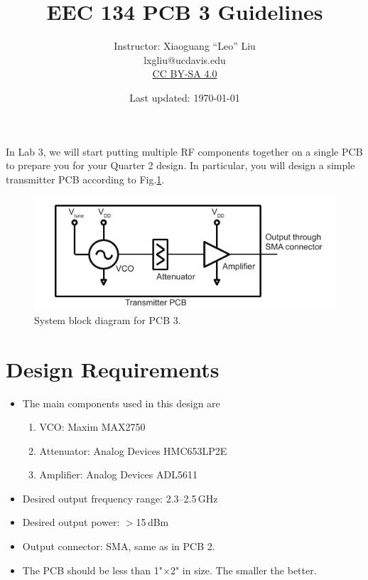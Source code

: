 \documentclass[letterpaper, 11pt]{article}
\begin{document}
\title{EEC 134 PCB 3 Guidelines}
\author{Instructor: Xiaoguang ``Leo'' Liu\\lxgliu@ucdavis.edu \\
	\small \href{http://creativecommons.org/licenses/by-sa/4.0/}{CC BY-SA 4.0}}
\date{Last updated: \today}

\maketitle

In Lab 3, we will start putting multiple RF components together on a single PCB to prepare you for your Quarter 2 design. In particular, you will design a simple transmitter PCB according to Fig.\ref{fig:pcb3}.

\begin{figure}[h]
	\centering
	\includegraphics{blockdiagram.pdf}
	\caption{System block diagram for PCB 3.}
	\label{fig:pcb3}
\end{figure}

\section{Design Requirements}

\begin{itemize}
	\item The main components used in this design are 
		\begin{enumerate}
			\item VCO: Maxim MAX2750
			\item Attenuator: Analog Devices HMC653LP2E
			\item Amplifier: Analog Devices ADL5611
		\end{enumerate}
	\item Desired output frequency range: 2.3--2.5\,GHz
	\item Desired output power: $>$15\,dBm
	\item Output connector: SMA, same as in PCB 2. 
	\item The PCB should be less than 1"$\times$2" in size. The smaller the better. 
\end{itemize}
\end{document}
